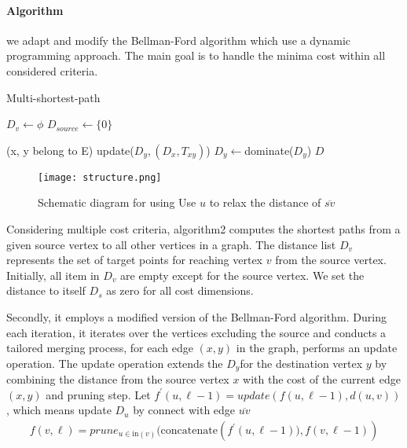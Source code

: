 \paragraph{Algorithm}
we adapt and modify the Bellman-Ford algorithm which use a dynamic programming approach. The main goal is to handle the minima cost within all considered criteria.

\begin{algorithm}
\caption{Multi-shortest-path}
\begin{algorithmic}[1]
            \State$D_v \gets \phi$
        \EndFor
        \State$D_{source} \gets \{0\}$
        
                (x, y belong to E)
                \State update($D_y, (D_x, T_{xy})$)
            \EndFor
            \State$D_y \gets$dominate($D_y$)
        \EndFor
        \State \Return$D$
    \EndFunction
\end{algorithmic}
\end{algorithm}

\begin{figure}[ht!]
\centering
\texttt{[image: structure.png]}
\caption{Schematic diagram for using Use $u$ to relax the distance of $\overline{sv}$ \label{structure}}
\end{figure}

Considering multiple cost criteria, algorithm2 computes the shortest paths from a given source vertex to all other vertices in a graph. The distance list $D_v$ represents the set of target points for reaching vertex $v$ from the source vertex. Initially, all item in $D_v$ are empty except for the source vertex. We set the distance to itself $D_s$ as zero for all cost dimensions. 

Secondly, it employs a modified version of the Bellman-Ford algorithm. During each iteration, it iterates over the vertices excluding the source and conducts a tailored merging process, for each edge $(x, y)$ in the graph, performs an update operation. The update operation extends the $D_y$for the destination vertex $y$ by combining the distance from the source vertex $x$ with the cost of the current edge $(x, y)$ and pruning step. Let $f^\prime (u, \ell - 1) = update(f(u, \ell - 1), d(u, v))$, which means update $D_u$ by connect with edge $\overline{uv}$
\begin{equation}
\begin{aligned}
f(v, \ell) = prune_{u \in \text{in}(v)}(\text{concatenate}\left(f^\prime (u, \ell - 1)) ,f(v, \ell - 1)\right)
\end{aligned}
\end{equation}

